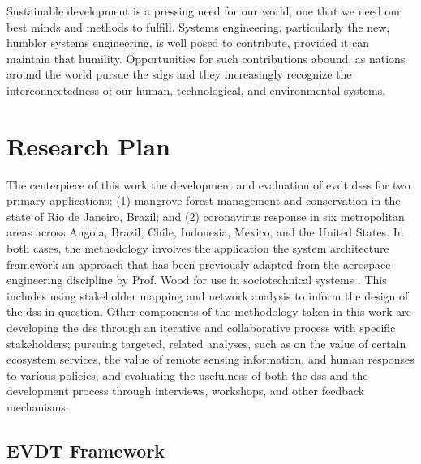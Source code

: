 \documentclass[notitlepage]{article}
\begin{document}
Sustainable development is a pressing need for our world, one that we need our best minds and methods to fulfill. Systems engineering, particularly the new, humbler systems engineering, is well posed to contribute, provided it can maintain that humility. Opportunities for such contributions abound, as nations around the world pursue the \acp{sdg} and they increasingly recognize the interconnectedness of our human, technological, and environmental systems.


\section{Research Plan}\label{sec:plan}

The centerpiece of this work the development and evaluation of \ac{evdt} \acp{dss} for two primary applications: (1) mangrove forest management and conservation in the state of Rio de Janeiro, Brazil; and (2) coronavirus response in six metropolitan areas across Angola, Brazil, Chile, Indonesia, Mexico, and the United States. In both cases, the methodology involves the application the system architecture framework \cite{maierArtSystemsArchitecting2009, crawleySystemArchitectureStrategy2015} an approach that has been previously adapted from the aerospace engineering discipline by Prof. Wood for use in sociotechnical systems \cite{pfotenhauerArchitectingComplexInternational2016}. This includes using stakeholder mapping and network analysis to inform the design of the \ac{dss} in question. Other components of the methodology taken in this work are developing the \ac{dss} through an iterative and collaborative process with specific stakeholders; pursuing targeted, related analyses, such as on the value of certain ecosystem services, the value of remote sensing information, and human responses to various policies; and evaluating the usefulness of both the \ac{dss} and the development process through interviews, workshops, and other feedback mechanisms.

\subsection{EVDT Framework}
\end{document}
